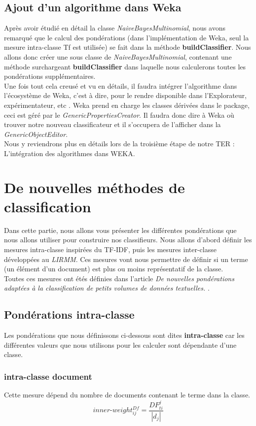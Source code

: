 \documentclass{article}
\begin{document}
\subsection{Ajout d'un algorithme dans Weka}
Après avoir étudié en détail la classe \textit{NaiveBayesMultinomial}, nous avons remarqué que le calcul des pondérations (dans l'implémentation de Weka, seul la mesure intra-classe Tf est utilisée) se fait dans la méthode \textbf{buildClassifier}. Nous allons donc créer une sous classe de \textit{NaiveBayesMultinomial}, contenant une méthode surchargeant \textbf{buildClassifier} dans laquelle nous calculerons toutes les pondérations supplémentaires.\\
Une fois tout cela creusé et vu en détails, il faudra intégrer l'algorithme dans l'écosystème de Weka, c'est à dire, pour le rendre disponible dans l'Explorateur, expérimentateur, etc . 
Weka prend en charge les classes dérivées dans le package, ceci est géré par le \textit{GenericPropertiesCreator}. Il faudra donc dire à Weka où trouver notre nouveau classificateur et il s'occupera de l'afficher dans la \textit{GenericObjectEditor}.\\
Nous y reviendrons plus en détails lors de la troisième étape de notre TER : L'intégration des algorithmes dans WEKA.
\section{De nouvelles méthodes de classification}
Dans cette partie, nous allons vous présenter les différentes pondérations que nous allons utiliser pour construire nos classifieurs.
Nous allons d'abord définir les mesures intra-classe inspirées du TF-IDF, puis les mesures inter-classe développées au \textit{LIRMM}.
Ces mesures vont nous permettre de définir si un terme (un élément d'un document) est plus ou moins représentatif de la classe.\\Toutes ces mesures ont étés définies dans l'article \textit{De nouvelles pondérations adaptées à la classification de petits volumes de données textuelles. }\cite{RNTIB}.
\subsection{Pondérations intra-classe}
Les pondérations que nous définissons ci-dessous sont dites \textbf{intra-classe} car les différentes valeurs que nous utilisons pour les
calculer sont dépendante d'une classe.
\subsubsection*{intra-classe document}
Cette mesure dépend du nombre de documents contenant le terme dans la classe.
  \[ inner\mbox{-}weight_{ij}^{Df} = \frac{DF_{ti}^j}{|d_{j}|}\]
  
\end{document}
